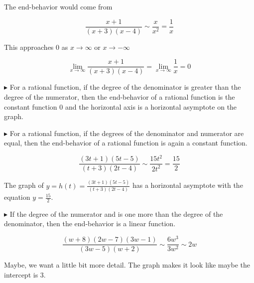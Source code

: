 \documentclass{ximera}
\begin{document}
The end-behavior would come from 


\[ \frac{x+1}{(x+3)(x-4)}    \sim    \frac{x}{x^2} = \frac{1}{x}  \]


This approaches $0$ as $x \to \infty$ or $x \to -\infty$ 



\[
\lim\limits_{x \to \infty} \frac{x+1}{(x+3)(x-4)} = \lim\limits_{x \to \infty} \frac{1}{x} = 0
\]









$\blacktriangleright$   For a rational function, if the degree of the denominator is greater than the degree of the numerator, then the end-behavior of a rational function is the constant function $0$ and the horizontal axis is a horizontal asymptote on the graph.




$\blacktriangleright$   For a rational function, if the degrees of the denominator and numerator are equal, then the end-behavior of a rational function is again a constant function.


\[ \frac{(3t+1)(5t-5)}{(t+3)(2t-4)}    \sim    \frac{15t^2}{2t^2} = \frac{15}{2}  \]




The graph of $y = h(t) = \frac{(3t+1)(5t-5)}{(t+3)(2t-4)} $ has a horizontal asymptote with the equation $y = \frac{15}{2}$.




$\blacktriangleright$   If the degree of the numerator and is one more than the degree of the denominator, then the end-behavior is a linear function.


\[ \frac{(w+8)(2w-7)(3w-1)}{(3w-5)(w+2)}    \sim   \frac{6w^3}{3w^2} \sim 2w \]








\begin{center}
\end{center}




Maybe, we want a little bit more detail. The graph makes it look like maybe the intercept is $3$.







\begin{center}
\end{center}
\end{document}
